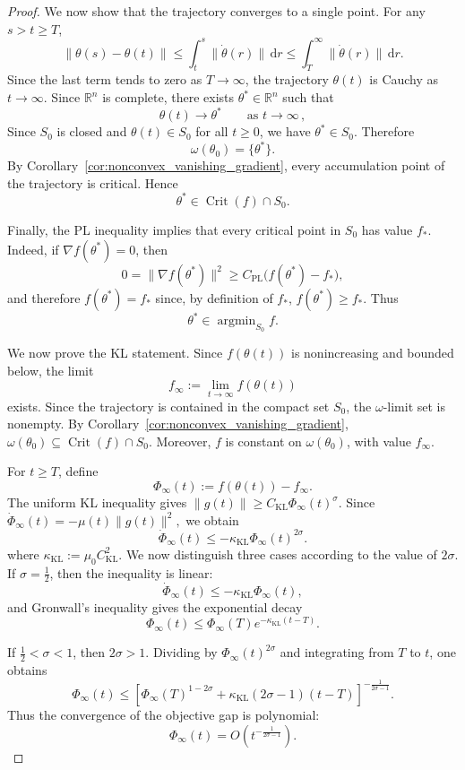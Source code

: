 \documentclass{article} %
\begin{document}
\begin{proof}
We now show that the trajectory converges to a single point. For any $s>t\ge T$,
\[
    \|\theta(s)-\theta(t)\|
    \le
    \int_t^s \|\dot\theta(r)\|\,\mathrm dr
    \le
    \int_T^\infty \|\dot\theta(r)\|\,\mathrm dr .
\]
Since the last term tends to zero as $T\to\infty$, the trajectory $\theta(t)$ is
Cauchy as $t\to\infty$. Since $\mathbb R^n$ is complete, there exists
$\theta^*\in\mathbb R^n$ such that \cite[Theorem~3.11]{Rudin1976}
\[
    \theta(t)\to\theta^*
    \qquad \text{as } t\to\infty \,,
\]
Since $S_0$ is closed and $\theta(t)\in S_0$ for all $t\ge0$, we have $\theta^*\in S_0$. Therefore
\[
    \omega(\theta_0)=\{\theta^*\}.
\]
By Corollary~\ref{cor:nonconvex_vanishing_gradient}, every accumulation point of
the trajectory is critical. Hence
\[
    \theta^*\in\operatorname{Crit}(f)\cap S_0 .
\]

Finally, the PL inequality implies that every critical point in \(S_0\) has value \(f_*\). Indeed, if \(\nabla f(\theta^*)=0\), then
\[
    0
    =
    \|\nabla f(\theta^*)\|^2
    \geq
    C_{\mathrm{PL}}\bigl(f(\theta^*)-f_*\bigr),
\]
and therefore \(f(\theta^*)=f_*\) since, by definition of $f_*$, $f(\theta^*)\geq f_*$. Thus
\[
    \theta^*\in\operatorname{argmin}_{S_0}f.
\]

We now prove the KL statement. Since \(f(\theta(t))\) is nonincreasing and bounded below, the limit
\[
    f_\infty:=\lim_{t\to\infty}f(\theta(t))
\]
exists. Since the trajectory is contained in the compact set \(S_0\), the \(\omega\)-limit set is nonempty. By Corollary~\ref{cor:nonconvex_vanishing_gradient}, $\omega(\theta_0)\subseteq \operatorname{Crit}(f)\cap S_0.$ Moreover, \(f\) is constant on \(\omega(\theta_0)\), with value \(f_\infty\).

For \(t\geq T\), define
\[
    \Phi_\infty(t):=f(\theta(t))-f_\infty.
\]
The uniform KL inequality gives $\|g(t)\|\geq C_{\mathrm{KL}}\Phi_\infty(t)^\sigma$. Since $\dot\Phi_\infty(t) = -\mu(t)\|g(t)\|^2,$ we obtain
\[
    \dot\Phi_\infty(t)
    \leq
    -\kappa_{\mathrm{KL}}\Phi_\infty(t)^{2\sigma}.
\]
where $\kappa_{\mathrm{KL}}:=\mu_0 C_{\mathrm{KL}}^2$. We now distinguish three cases according to the value of \(2\sigma\). If \(\sigma=\frac12\), then the inequality is linear:
\[
    \dot\Phi_\infty(t)
    \leq
    -\kappa_{\mathrm{KL}}\Phi_\infty(t),
\]
and Gronwall's inequality gives the exponential decay
\[
    \Phi_\infty(t)
    \leq
    \Phi_\infty(T)e^{-\kappa_{\mathrm{KL}}(t-T)}.
\]

If \(\frac12<\sigma<1\), then \(2\sigma>1\). Dividing by
\(\Phi_\infty(t)^{2\sigma}\) and integrating from \(T\) to \(t\), one obtains
\[
    \Phi_\infty(t)
    \leq
    \left[
        \Phi_\infty(T)^{1-2\sigma}
        +
        \kappa_{\mathrm{KL}}(2\sigma-1)(t-T)
    \right]^{-\frac1{2\sigma-1}}.
\]
Thus the convergence of the objective gap is polynomial:
\[
    \Phi_\infty(t)
    =
    O\!\left(t^{-\frac1{2\sigma-1}}\right).
\]


\end{proof}
\end{document}

